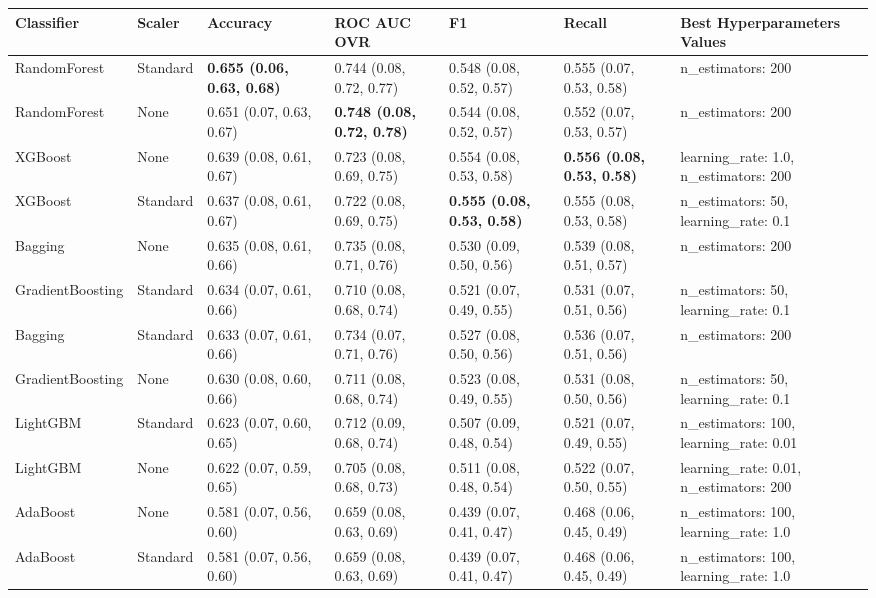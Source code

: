 \begin{tabular}{lllllll}
\toprule
Classifier & Scaler & Accuracy & ROC AUC OVR & F1 & Recall & Best Hyperparameters Values \\
\midrule
RandomForest & Standard & \textbf{0.655 (0.06, 0.63, 0.68)} & 0.744 (0.08, 0.72, 0.77) & 0.548 (0.08, 0.52, 0.57) & 0.555 (0.07, 0.53, 0.58) & {{n\_estimators: 200}} \\
RandomForest & None & 0.651 (0.07, 0.63, 0.67) & \textbf{0.748 (0.08, 0.72, 0.78)} & 0.544 (0.08, 0.52, 0.57) & 0.552 (0.07, 0.53, 0.57) & {{n\_estimators: 200}} \\
XGBoost & None & 0.639 (0.08, 0.61, 0.67) & 0.723 (0.08, 0.69, 0.75) & 0.554 (0.08, 0.53, 0.58) & \textbf{0.556 (0.08, 0.53, 0.58)} & {{learning\_rate: 1.0, n\_estimators: 200}} \\
XGBoost & Standard & 0.637 (0.08, 0.61, 0.67) & 0.722 (0.08, 0.69, 0.75) & \textbf{0.555 (0.08, 0.53, 0.58)} & 0.555 (0.08, 0.53, 0.58) & {{n\_estimators: 50, learning\_rate: 0.1}} \\
Bagging & None & 0.635 (0.08, 0.61, 0.66) & 0.735 (0.08, 0.71, 0.76) & 0.530 (0.09, 0.50, 0.56) & 0.539 (0.08, 0.51, 0.57) & {{n\_estimators: 200}} \\
GradientBoosting & Standard & 0.634 (0.07, 0.61, 0.66) & 0.710 (0.08, 0.68, 0.74) & 0.521 (0.07, 0.49, 0.55) & 0.531 (0.07, 0.51, 0.56) & {{n\_estimators: 50, learning\_rate: 0.1}} \\
Bagging & Standard & 0.633 (0.07, 0.61, 0.66) & 0.734 (0.07, 0.71, 0.76) & 0.527 (0.08, 0.50, 0.56) & 0.536 (0.07, 0.51, 0.56) & {{n\_estimators: 200}} \\
GradientBoosting & None & 0.630 (0.08, 0.60, 0.66) & 0.711 (0.08, 0.68, 0.74) & 0.523 (0.08, 0.49, 0.55) & 0.531 (0.08, 0.50, 0.56) & {{n\_estimators: 50, learning\_rate: 0.1}} \\
LightGBM & Standard & 0.623 (0.07, 0.60, 0.65) & 0.712 (0.09, 0.68, 0.74) & 0.507 (0.09, 0.48, 0.54) & 0.521 (0.07, 0.49, 0.55) & {{n\_estimators: 100, learning\_rate: 0.01}} \\
LightGBM & None & 0.622 (0.07, 0.59, 0.65) & 0.705 (0.08, 0.68, 0.73) & 0.511 (0.08, 0.48, 0.54) & 0.522 (0.07, 0.50, 0.55) & {{learning\_rate: 0.01, n\_estimators: 200}} \\
AdaBoost & None & 0.581 (0.07, 0.56, 0.60) & 0.659 (0.08, 0.63, 0.69) & 0.439 (0.07, 0.41, 0.47) & 0.468 (0.06, 0.45, 0.49) & {{n\_estimators: 100, learning\_rate: 1.0}} \\
AdaBoost & Standard & 0.581 (0.07, 0.56, 0.60) & 0.659 (0.08, 0.63, 0.69) & 0.439 (0.07, 0.41, 0.47) & 0.468 (0.06, 0.45, 0.49) & {{n\_estimators: 100, learning\_rate: 1.0}} \\

\end{tabular}
